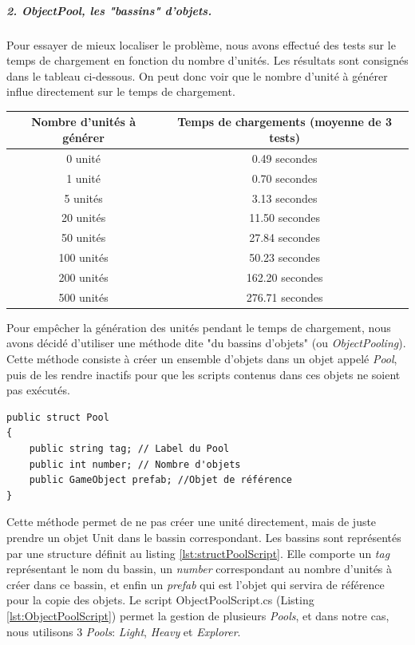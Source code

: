 \documentclass{report}
\begin{document}
\subparagraph{2. \textit{ObjectPool}, les "bassins" d'objets.}Pour essayer de mieux localiser le problème, nous avons effectué des tests sur le temps de chargement en fonction du nombre d'unités. Les résultats sont consignés dans le tableau ci-dessous. On peut donc voir que le nombre d'unité à générer influe directement sur le temps de chargement.\newline
\begin{center}
\begin{tabular}{c|c}
  \hline
  Nombre d'unités à générer & Temps de chargements (moyenne de 3 tests) \\
  \hline
  0 unité & 0.49 secondes \\
  1 unité & 0.70 secondes \\
  5 unités & 3.13 secondes \\
  20 unités & 11.50 secondes \\
  50 unités & 27.84 secondes \\
  100 unités & 50.23 secondes \\
  200 unités & 162.20 secondes \\
  500 unités & 276.71 secondes \\
  \hline
\end{tabular}
\end{center}
Pour empêcher la génération des unités pendant le temps de chargement, nous avons décidé d'utiliser une méthode dite "du bassins d'objets" (ou \textit{ObjectPooling}). Cette méthode consiste à créer un ensemble d'objets dans un objet appelé \textit{Pool}, puis de les rendre inactifs pour que les scripts contenus dans ces objets ne soient pas exécutés.

 \begin{lstlisting}[language={[Sharp]C},label={lst:structPoolScript}, caption= Code de la structure \textit{Pool} de ObjectPool.cs]
public struct Pool
{
    public string tag; // Label du Pool
    public int number; // Nombre d'objets
    public GameObject prefab; //Objet de référence
}
\end{lstlisting}

Cette méthode permet de ne pas créer une unité directement, mais de juste prendre un objet Unit dans le bassin correspondant. Les bassins sont représentés par une structure définit au listing \ref{lst:structPoolScript}. Elle comporte un \textit{tag} représentant le nom du bassin, un  \textit{number} correspondant au nombre d'unités à créer dans ce bassin, et enfin un \textit{prefab} qui est l'objet qui servira de référence pour la copie des objets. Le script ObjectPoolScript.cs (Listing  \ref{lst:ObjectPoolScript}) permet la gestion de plusieurs \textit{Pools}, et dans notre cas, nous utilisons 3 \textit{Pools}:  \textit{Light},  \textit{Heavy} et  \textit{Explorer}.
\end{document}
